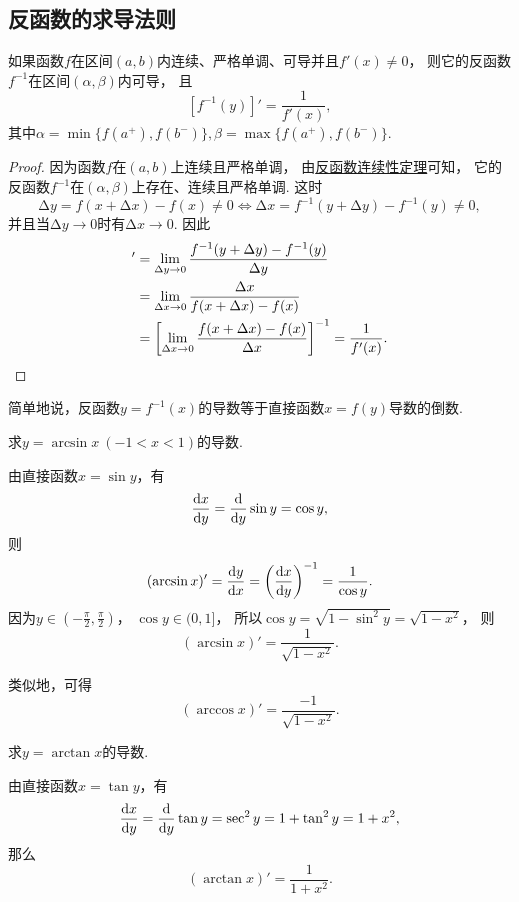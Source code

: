 \subsection{反函数的求导法则}
\begin{theorem}
如果函数\(f\)在区间\((a,b)\)内连续、严格单调、可导并且\(f'(x)\neq0\)，
则它的反函数\(f^{-1}\)在区间\((\alpha,\beta)\)内可导，
且\[
	[f^{-1}(y)]'=\frac{1}{f'(x)},
\]
其中\(\alpha=\min\{f(a^+),f(b^-)\},
\beta=\max\{f(a^+),f(b^-)\}\).
\begin{proof}
因为函数\(f\)在\((a,b)\)上连续且严格单调，
由\hyperref[theorem:极限.连续函数的极限2]{反函数连续性定理}可知，
它的反函数\(f^{-1}\)在\((\alpha,\beta)\)上存在、连续且严格单调.
这时\[
	\increment y = f(x + \increment x) - f(x) \neq 0
	\iff
	\increment x = f^{-1}(y + \increment y) - f^{-1}(y) \neq 0,
\]
并且当\(\increment y \to 0\)时有\(\increment x \to 0\).
因此\begin{align*}
	[f^{-1}(y)]'
	&= \lim_{\increment y \to 0}
		\frac{f^{-1}(y + \increment y) - f^{-1}(y)}{\increment y} \\
	&= \lim_{\increment x \to 0}
		\frac{\increment x}{f(x + \increment x) - f(x)} \\
	&= \left[
		\lim_{\increment x \to 0}
		\frac{f(x + \increment x) - f(x)}{\increment x}
	\right]^{-1}
	= \frac1{f'(x)}.
	\qedhere
\end{align*}
\end{proof}
\end{theorem}

简单地说，反函数\(y=f^{-1}(x)\)的导数等于直接函数\(x=f(y)\)导数的倒数.

\begin{example}
求\(y=\arcsin x\ (-1<x<1)\)的导数.
\begin{solution}
由直接函数\(x=\sin y\)，有\[
	\dv{x}{y}
	= \dv{y} \sin y
	= \cos y,
\]则\[
	(\arcsin x)'
	= \dv{y}{x}
	= \left(\dv{x}{y}\right)^{-1}
	= \frac{1}{\cos y}.
\]
因为\(y \in (-\frac{\pi}{2},\frac{\pi}{2})\)，
\(\cos y \in (0,1]\)，
所以\(\cos y = \sqrt{1 - \sin^2 y} = \sqrt{1 - x^2}\)，
则\[
	(\arcsin x)' = \frac{1}{\sqrt{1 - x^2}}.
\]
\end{solution}
\end{example}

类似地，可得\[
	(\arccos x)' = \frac{-1}{\sqrt{1 - x^2}}.
\]

\begin{example}
求\(y=\arctan x\)的导数.
\begin{solution}
由直接函数\(x=\tan y\)，有\[
	\dv{x}{y}
	= \dv{y} \tan y
	= \sec^2 y
	= 1 + \tan^2 y
	= 1 + x^2,
\]
那么\[
	(\arctan x)' = \frac{1}{1+x^2}.
\]
\end{solution}
\end{example}

